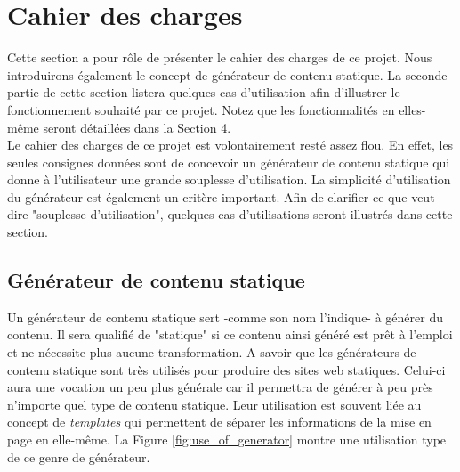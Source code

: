 \section{Cahier des charges}

	Cette section a pour rôle de présenter le cahier des charges de ce projet. Nous introduirons également le concept de générateur de contenu statique. La seconde partie de cette section listera quelques cas d'utilisation afin d'illustrer le fonctionnement souhaité par ce projet. Notez que les fonctionnalités en elles-même seront détaillées dans la Section 4.\\
	
	Le cahier des charges de ce projet est volontairement resté assez flou. En effet, les seules consignes données sont de concevoir un générateur de contenu statique qui donne à l'utilisateur une grande souplesse d'utilisation. La simplicité d'utilisation du générateur est également un critère important. Afin de clarifier ce que veut dire "souplesse d'utilisation", quelques cas d'utilisations seront illustrés dans cette section.\\
	
	
	\subsection{Générateur de contenu statique}
		Un générateur de contenu statique sert -comme son nom l'indique- à générer du contenu. Il sera qualifié de "statique" si ce contenu ainsi généré est prêt à l'emploi et ne nécessite plus aucune transformation. A savoir que les générateurs de contenu statique sont très utilisés pour produire des sites web statiques. Celui-ci aura une vocation un peu plus générale car il permettra de générer à peu près n'importe quel type de contenu statique. Leur utilisation est souvent liée au concept de \textit{templates} qui permettent de séparer les informations de la mise en page en elle-même. La Figure \ref{fig:use_of_generator} montre une utilisation type de ce genre de générateur.\\
		
